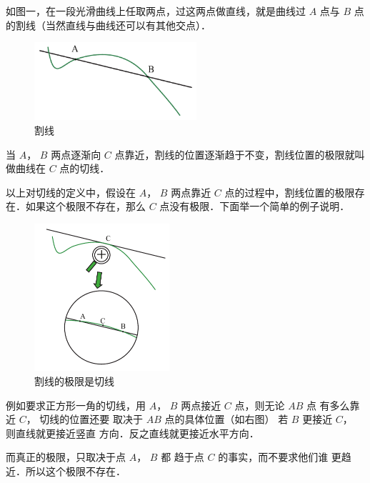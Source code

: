 
如图一，在一段光滑曲线上任取两点，过这两点做直线，就是曲线过 $A$ 点与 $B$ 点的割线（当然直线与曲线还可以有其他交点）．
\begin{figure}[h]
\centering
\includegraphics[width=6cm]{./figures/TanL1.pdf}
\caption{割线}
\end{figure}
当 $A$，  $B$ 两点逐渐向 $C$ 点靠近，割线的位置逐渐趋于不变，割线位置的极限就叫做曲线在 $C$ 点的切线．

以上对切线的定义中，假设在 $A$，  $B$ 两点靠近 $C$ 点的过程中，割线位置的极限存在．如果这个极限不存在，那么 $C$ 点没有极限．下面举一个简单的例子说明．

\begin{figure}[h]
\vskip 0pt
\centering
\includegraphics[width=5cm]{./figures/TanL2.pdf}
\caption{割线的极限是切线}
\end{figure}
例如要求正方形一角的切线，用
 $A$，  $B$ 两点接近 $C$ 点，则无论 $AB$ 点
有多么靠近 $C$， 切线的位置还要
取决于 $AB$ 点的具体位置（如右图）
若 $B$ 更接近 $C$， 则直线就更接近竖直
方向．反之直线就更接近水平方向．


而真正的极限，只取决于点 $A$，  $B$ 都
趋于点 $C$ 的事实，而不要求他们谁
更趋近．所以这个极限不存在．
















